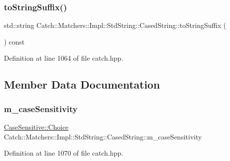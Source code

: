 \subsubsection{\texorpdfstring{to\+String\+Suffix()}{toStringSuffix()}}
{\footnotesize\ttfamily std\+::string Catch\+::\+Matchers\+::\+Impl\+::\+Std\+String\+::\+Cased\+String\+::to\+String\+Suffix (\begin{DoxyParamCaption}{ }\end{DoxyParamCaption}) const\hspace{0.3cm}{\ttfamily [inline]}}



Definition at line 1064 of file catch.\+hpp.



\subsection{Member Data Documentation}
\hypertarget{struct_catch_1_1_matchers_1_1_impl_1_1_std_string_1_1_cased_string_af399ed93051d8981e298206dee6898b3}{}\label{struct_catch_1_1_matchers_1_1_impl_1_1_std_string_1_1_cased_string_af399ed93051d8981e298206dee6898b3} 
\subsubsection{\texorpdfstring{m\+\_\+case\+Sensitivity}{m\_caseSensitivity}}
{\footnotesize\ttfamily \hyperlink{struct_catch_1_1_case_sensitive_aad49d3aee2d97066642fffa919685c6a}{Case\+Sensitive\+::\+Choice} Catch\+::\+Matchers\+::\+Impl\+::\+Std\+String\+::\+Cased\+String\+::m\+\_\+case\+Sensitivity}



Definition at line 1070 of file catch.\+hpp.

\hypertarget{struct_catch_1_1_matchers_1_1_impl_1_1_std_string_1_1_cased_string_a9f8ce063a934330ac59bf8638f047e99}{}\label{struct_catch_1_1_matchers_1_1_impl_1_1_std_string_1_1_cased_string_a9f8ce063a934330ac59bf8638f047e99} 
